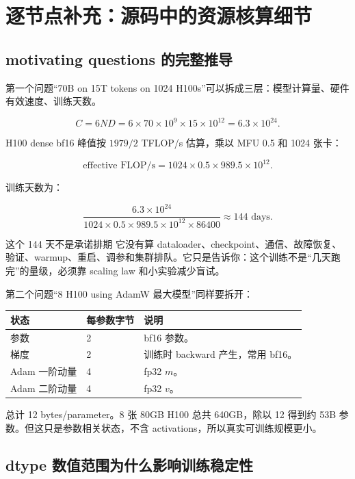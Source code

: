 \section{逐节点补充：源码中的资源核算细节}

\subsection{motivating questions 的完整推导}

第一个问题“70B on 15T tokens on 1024 H100s”可以拆成三层：模型计算量、硬件有效速度、训练天数。

\[
C = 6ND = 6\times 70\times 10^9\times 15\times 10^{12}=6.3\times 10^{24}.
\]

H100 dense bf16 峰值按 \(1979/2\) TFLOP/s 估算，乘以 MFU 0.5 和 1024 张卡：

\[
\text{effective FLOP/s}=1024\times 0.5\times 989.5\times 10^{12}.
\]

训练天数为：

\[
\frac{6.3\times 10^{24}}{1024\times 0.5\times 989.5\times 10^{12}\times 86400}\approx 144\text{ days}.
\]

\begin{warningbox}{这个 144 天不是承诺排期}
它没有算 dataloader、checkpoint、通信、故障恢复、验证、warmup、重启、调参和集群排队。它只是告诉你：这个训练不是“几天跑完”的量级，必须靠 scaling law 和小实验减少盲试。
\end{warningbox}

第二个问题“8 H100 using AdamW 最大模型”同样要拆开：

\begin{longtable}{p{}p{}p{}}
\toprule
\textbf{状态} & \textbf{每参数字节} & \textbf{说明} \\
\midrule
参数 & 2 & bf16 参数。 \\
梯度 & 2 & 训练时 backward 产生，常用 bf16。 \\
Adam 一阶动量 & 4 & fp32 \(m\)。 \\
Adam 二阶动量 & 4 & fp32 \(v\)。 \\
\bottomrule
\end{longtable}

总计 12 bytes/parameter。8 张 80GB H100 总共 640GB，除以 12 得到约 53B 参数。但这只是参数相关状态，不含 activations，所以真实可训练规模更小。

\subsection{dtype 数值范围为什么影响训练稳定性}

